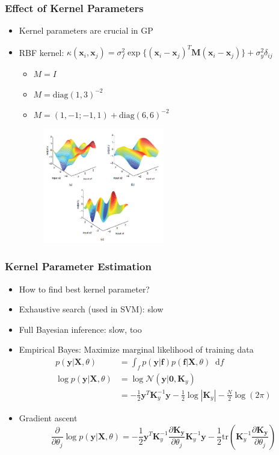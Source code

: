 \documentclass{beamer}
\newcommand*\diff{\mathop{}\!\mathrm{d}}
\begin{document}
\begin{frame}
	\frametitle{Effect of Kernel Parameters}
	\begin{itemize}
		\item Kernel parameters are crucial in GP
		\item RBF kernel: $\kappa(\bm{x}_i, \bm{x}_j) = \sigma_f^2 \exp \{ (\bm{x}_i-\bm{x}_j)^T \bm{M}(\bm{x}_i-\bm{x}_j) \} +\sigma_y^2 \delta_{ij}$
			\begin{itemize}
				\item $M=I$
				\item $M=\text{diag}(1,3)^{-2}$
				\item $M=(1,-1;-1,1)+\text{diag}(6,6)^{-2}$
			\end{itemize}
			\begin{figure}
				\centering
				\includegraphics[width=0.5\textwidth]{img/kernel_param.png}
			\end{figure}
	\end{itemize}	
\end{frame}
\begin{frame}
	\frametitle{Kernel Parameter Estimation}
	\begin{itemize}
		\item How to find best kernel parameter?
		\item Exhaustive search (used in SVM): slow
		\item Full Bayesian inference: slow, too
		\item Empirical Bayes: Maximize {\color{red}marginal} likelihood of training data
			\begin{align*}
				p(\bm{y}|\bm{X}, \theta) & = \int_f p(\bm{y}|\bm{f}) p(\bm{f}|\bm{X}, \theta) \diff f \\				
				\log p(\bm{y}|\bm{X}, \theta) & = \log \mathcal{N}(\bm{y}|\bm{0}, \bm{K}_y) \\
				& = -\frac{1}{2} \bm{y}^T\bm{K}_y^{ - 1}\bm{y} - \frac{1}{2}\log |\bm{K}_y| - \frac{N}{2}\log (2\pi)
			\end{align*}
		\item Gradient ascent
			\[
			\frac{\partial }{\partial \theta _j} \log p(\bm{y}|\bm{X}, \theta) = 
			-\frac{1}{2} \bm{y}^T\bm{K}_y^{-1}  \frac{\partial \bm{K_y}}{\partial \theta_j} \bm{K}_y^{-1}\bm{y} - \frac{1}{2} \text{tr}(\bm{K}_y^{-1}\frac{\partial \bm{K_y}}{\partial \theta_j})
			\]
	\end{itemize}
\end{frame}
\end{document}
